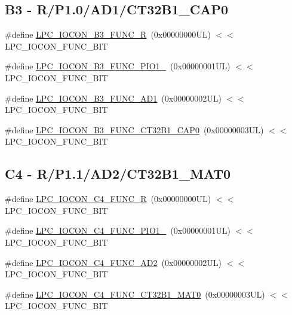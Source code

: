 \subsection*{B3 -\/ R/\+P1.0/\+A\+D1/\+C\+T32\+B1\+\_\+\+C\+A\+P0}
\begin{DoxyCompactItemize}
\item 
\#define \hyperlink{group___l_p_c___i_o_c_o_n___l_p_c1102___p_i_n_e_s_ga745545f76e10bc8663d8abf205ce3417}{L\+P\+C\+\_\+\+I\+O\+C\+O\+N\+\_\+\+B3\+\_\+\+F\+U\+N\+C\+\_\+R}~(0x00000000\+U\+L) $<$$<$ L\+P\+C\+\_\+\+I\+O\+C\+O\+N\+\_\+\+F\+U\+N\+C\+\_\+\+B\+IT
\item 
\#define \hyperlink{group___l_p_c___i_o_c_o_n___l_p_c1102___p_i_n_e_s_ga05526127ae3fdce2a8b9d838e7c0f6d0}{L\+P\+C\+\_\+\+I\+O\+C\+O\+N\+\_\+\+B3\+\_\+\+F\+U\+N\+C\+\_\+\+P\+I\+O1\+\_}~(0x00000001\+U\+L) $<$$<$ L\+P\+C\+\_\+\+I\+O\+C\+O\+N\+\_\+\+F\+U\+N\+C\+\_\+\+B\+IT
\item 
\#define \hyperlink{group___l_p_c___i_o_c_o_n___l_p_c1102___p_i_n_e_s_gaf638fc4d9aea6f2b8f9b5bf1ab0f6942}{L\+P\+C\+\_\+\+I\+O\+C\+O\+N\+\_\+\+B3\+\_\+\+F\+U\+N\+C\+\_\+\+A\+D1}~(0x00000002\+U\+L) $<$$<$ L\+P\+C\+\_\+\+I\+O\+C\+O\+N\+\_\+\+F\+U\+N\+C\+\_\+\+B\+IT
\item 
\#define \hyperlink{group___l_p_c___i_o_c_o_n___l_p_c1102___p_i_n_e_s_gad92721a2f17acdc507bde9b386b6517a}{L\+P\+C\+\_\+\+I\+O\+C\+O\+N\+\_\+\+B3\+\_\+\+F\+U\+N\+C\+\_\+\+C\+T32\+B1\+\_\+\+C\+A\+P0}~(0x00000003\+U\+L) $<$$<$ L\+P\+C\+\_\+\+I\+O\+C\+O\+N\+\_\+\+F\+U\+N\+C\+\_\+\+B\+IT
\end{DoxyCompactItemize}
\subsection*{C4 -\/ R/\+P1.1/\+A\+D2/\+C\+T32\+B1\+\_\+\+M\+A\+T0}
\begin{DoxyCompactItemize}
\item 
\#define \hyperlink{group___l_p_c___i_o_c_o_n___l_p_c1102___p_i_n_e_s_ga5109d5a6418fa651ad73bc316a2ca64d}{L\+P\+C\+\_\+\+I\+O\+C\+O\+N\+\_\+\+C4\+\_\+\+F\+U\+N\+C\+\_\+R}~(0x00000000\+U\+L) $<$$<$ L\+P\+C\+\_\+\+I\+O\+C\+O\+N\+\_\+\+F\+U\+N\+C\+\_\+\+B\+IT
\item 
\#define \hyperlink{group___l_p_c___i_o_c_o_n___l_p_c1102___p_i_n_e_s_ga68ee6b56ec7c4eea69bb4602a44f2bf3}{L\+P\+C\+\_\+\+I\+O\+C\+O\+N\+\_\+\+C4\+\_\+\+F\+U\+N\+C\+\_\+\+P\+I\+O1\+\_}~(0x00000001\+U\+L) $<$$<$ L\+P\+C\+\_\+\+I\+O\+C\+O\+N\+\_\+\+F\+U\+N\+C\+\_\+\+B\+IT
\item 
\#define \hyperlink{group___l_p_c___i_o_c_o_n___l_p_c1102___p_i_n_e_s_gad03ecd173dbeb860f3ef155bf598debc}{L\+P\+C\+\_\+\+I\+O\+C\+O\+N\+\_\+\+C4\+\_\+\+F\+U\+N\+C\+\_\+\+A\+D2}~(0x00000002\+U\+L) $<$$<$ L\+P\+C\+\_\+\+I\+O\+C\+O\+N\+\_\+\+F\+U\+N\+C\+\_\+\+B\+IT
\item 
\#define \hyperlink{group___l_p_c___i_o_c_o_n___l_p_c1102___p_i_n_e_s_gad9da73ec7045034730c0ac2540a34c16}{L\+P\+C\+\_\+\+I\+O\+C\+O\+N\+\_\+\+C4\+\_\+\+F\+U\+N\+C\+\_\+\+C\+T32\+B1\+\_\+\+M\+A\+T0}~(0x00000003\+U\+L) $<$$<$ L\+P\+C\+\_\+\+I\+O\+C\+O\+N\+\_\+\+F\+U\+N\+C\+\_\+\+B\+IT
\end{DoxyCompactItemize}
